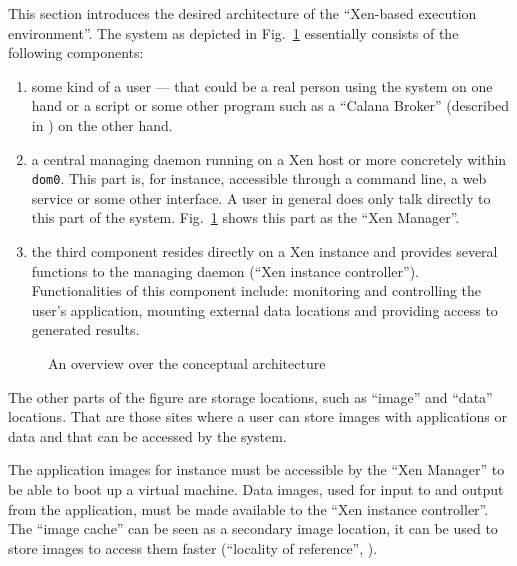 This  section  introduces  the  desired architecture  of  the  ``Xen-based
execution     environment''.      The     system    as     depicted     in
Fig.~\ref{fig:architecture}   essentially   consists   of  the   following
components:
\begin{enumerate}
  
\item some kind of a user --- that could be a real person using the system
  on  one hand  or  a script  or some  other  program such  as a  ``Calana
  Broker''        (described        in        \cite{dalheimer05agentbased,
    dalheimer06calanaprotocol}) on the other hand.
  
\item a central  managing daemon running on a Xen  \cite{xen} host or more
  concretely within \texttt{dom0}.  This part is, for instance, accessible
  through a command line, a web service or some other interface. A user in
  general  does  only   talk  directly  to  this  part   of  the  system.  
  Fig.~\ref{fig:architecture} shows this part  as the ``Xen Manager''.
  
\item the third component resides  directly on a Xen instance and provides
  several functions to the  managing daemon (``Xen instance controller''). 
  Functionalities  of this component  include: monitoring  and controlling
  the user's  application, mounting external data  locations and providing
  access to generated results.

\end{enumerate}

\begin{figure}[htbp]
  \begin{center}
  \end{center}
  \caption[Architecture overview]{An overview over the conceptual
    architecture}
  \label{fig:architecture}
\end{figure}

The other parts of the figure are storage locations, such as ``image'' and
``data'' locations.   That are those sites  where a user  can store images
with applications  or data  and that  can be accessed  by the  system.

The  application images  for  instance  must be  accessible  by the  ``Xen
Manager'' to be able to boot  up a virtual machine.  Data images, used for
input to  and output from the  application, must be made  available to the
``Xen  instance  controller''.  The  ``image  cache''  can  be seen  as  a
secondary image  location, it can be  used to store images  to access them
faster (``locality of reference'', \cite{locality-principle}).

